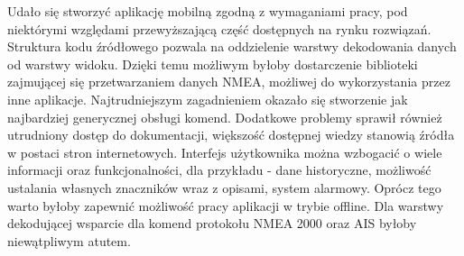 \documentclass[skorowidz,skroty]{dyplomWEZUT}
\begin{document}
\begin{zakonczenie}\label{chap:zakonczenie}
	Udało się stworzyć aplikację mobilną zgodną z wymaganiami pracy, pod niektórymi względami przewyższającą część dostępnych na rynku rozwiązań. Struktura kodu źródłowego pozwala na oddzielenie warstwy dekodowania danych od warstwy widoku. Dzięki temu możliwym byłoby dostarczenie biblioteki zajmującej się przetwarzaniem danych NMEA, możliwej do wykorzystania przez inne aplikacje. Najtrudniejszym zagadnieniem okazało się stworzenie jak najbardziej generycznej obsługi komend. Dodatkowe problemy sprawił również utrudniony dostęp do dokumentacji, większość dostępnej wiedzy stanowią źródła w postaci stron internetowych. 
	Interfejs użytkownika można wzbogacić o wiele informacji oraz funkcjonalności, dla przykładu - dane historyczne, możliwość ustalania własnych znaczników wraz z opisami, system alarmowy. Oprócz tego warto byłoby zapewnić możliwość pracy aplikacji w trybie offline. Dla warstwy dekodującej wsparcie dla komend protokołu NMEA 2000 oraz AIS byłoby niewątpliwym atutem.
\end{zakonczenie}

\printbibliography[heading=bibintoc]

\listoftables

\listoffigures

\listoflistings


\printindex
\end{document}
